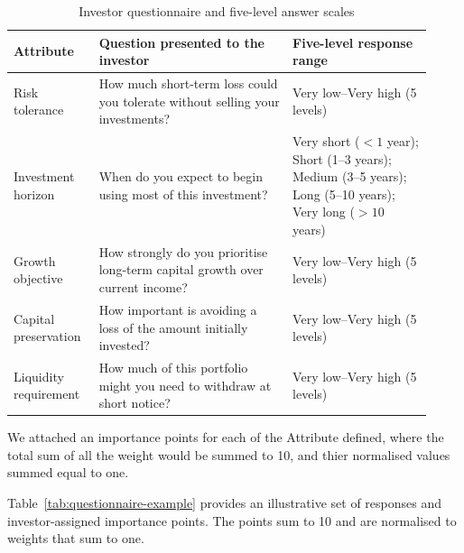 \documentclass[11pt,a4paper]{article}
\begin{document}
\begin{table}[H]
  \centering
  \small
  \caption{Investor questionnaire and five-level answer scales}
  \label{tab:questionnaire-scale}
  \begin{tabular}{>{\raggedright\arraybackslash}p{0.18\linewidth}>{\raggedright\arraybackslash}p{0.43\linewidth}>{\raggedright\arraybackslash}p{0.31\linewidth}}
    \toprule
    Attribute & Question presented to the investor & Five-level response range \\
    \midrule
    Risk tolerance & How much short-term loss could you tolerate without selling your investments? & Very low--Very high (5 levels) \\
    Investment horizon & When do you expect to begin using most of this investment? & Very short ($<1$ year); Short (1--3 years); Medium (3--5 years); Long (5--10 years); Very long ($>10$ years) \\
    Growth objective & How strongly do you prioritise long-term capital growth over current income? & Very low--Very high (5 levels) \\
    Capital preservation & How important is avoiding a loss of the amount initially invested? & Very low--Very high (5 levels) \\
    Liquidity requirement & How much of this portfolio might you need to withdraw at short notice? & Very low--Very high (5 levels) \\
    \bottomrule
  \end{tabular}
\end{table}

We attached an importance points for each of the Attribute defined, where the total sum of all the weight would be summed to 10, and thier normalised values summed equal to one.

Table~\ref{tab:questionnaire-example} provides an illustrative set of responses and investor-assigned importance points. The points sum to 10 and are normalised to weights that sum to one.
\end{document}
